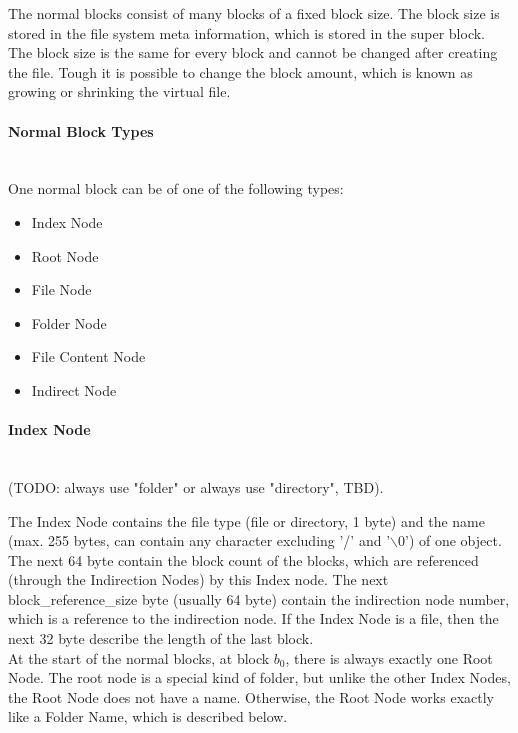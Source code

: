 \documentclass[a4paper,12pt]{article}
\begin{document}
The normal blocks consist of many blocks of a fixed block size. The block size is stored in the file system meta information, which is stored in the super block. The block size is the same for every block and cannot be changed after creating the file. Tough it is possible to change the block amount, which is known as growing or shrinking the virtual file.

\paragraph{Normal Block Types} ~\\

\noindent One normal block can be of one of the following types:

\begin{itemize}
  \item Index Node
    \item Root Node
    \item File Node
    \item Folder Node
  \item File Content Node
  \item Indirect Node
\end{itemize}

\paragraph{Index Node} ~\\

(TODO: always use "folder" or always use "directory", TBD).

The Index Node contains the file type (file or directory, 1 byte) and the name (max. 255 bytes, can contain any character excluding '/' and '$\backslash0$') of one object. The next 64 byte contain the block count of the blocks, which are referenced  (through the Indirection Nodes) by this Index node. The next block\_reference\_size byte (usually 64 byte) contain the indirection node number, which is a reference to the indirection node. If the Index Node is a file, then the next 32 byte describe the length of the last block.\\


At the start of the normal blocks, at block $b_{0}$, there is always exactly one Root Node. The root node is a special kind of folder, but unlike the other Index Nodes, the Root Node does not have a name. Otherwise, the Root Node works exactly like a Folder Name, which is described below.\\
\end{document}
